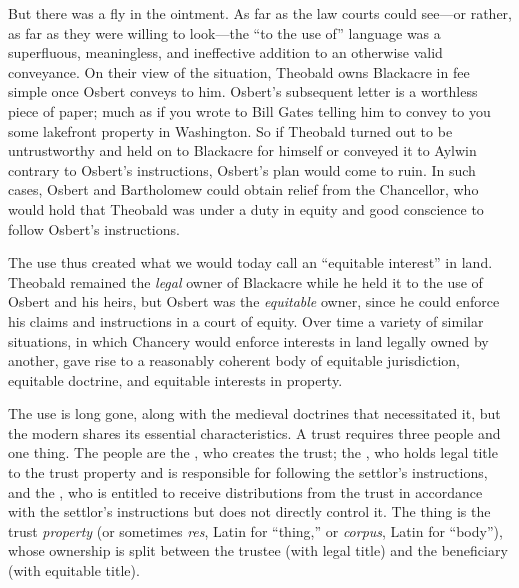 But there was a fly in the ointment. As far as the law courts could see---or
rather, as far as they were willing to look---the ``to the use of'' language was
a superfluous, meaningless, and ineffective addition to an otherwise valid
conveyance. On their view of the situation, Theobald owns Blackacre in fee
simple once Osbert conveys to him. Osbert's subsequent letter is a worthless
piece of paper; much as if you wrote to Bill Gates telling him to convey to you
some lakefront property in Washington. So if Theobald turned out to be
untrustworthy and held on to Blackacre for himself or conveyed it to Aylwin
contrary to Osbert's instructions, Osbert's plan would come to ruin. In such
cases, Osbert and Bartholomew could obtain relief from the Chancellor, who would
hold that Theobald was under a duty in equity and good conscience to follow
Osbert's instructions.

The use thus created what we would today call an ``equitable interest'' in land.
Theobald remained the \textit{legal} owner of Blackacre while he held it to the
use of Osbert and his heirs, but Osbert was the \textit{equitable} owner, since
he could enforce his claims and instructions in a court of equity. Over time a
variety of similar situations, in which Chancery would enforce interests in land
legally owned by another, gave rise to a reasonably coherent body of equitable
jurisdiction, equitable doctrine, and equitable interests in property.

The use is long gone, along with the medieval doctrines that necessitated it,
but the modern  shares its essential characteristics. A trust
requires
three people and one thing. The people are the , who creates the
trust; the , who holds legal title to the trust property and is
responsible for following the settlor's instructions, and the
, who is entitled to receive distributions from the trust in
accordance with the settlor's instructions but does not directly control it. The
thing is the trust \textit{property} (or sometimes \textit{res}, Latin for
``thing,'' or \textit{corpus}, Latin for ``body''), whose ownership is split
between the trustee (with legal title) and the beneficiary (with equitable
title).

